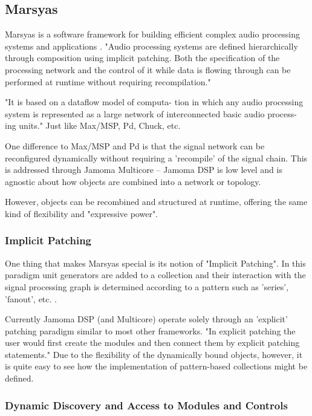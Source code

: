 \documentclass[twoside,10pt]{article}
\begin{document}

\subsection{Marsyas} %

Marsyas is a software framework for building efficient complex audio processing systems and applications \cite{Tzanetakis:2008}. "Audio processing systems are defined hierarchically through composition using implicit patching. Both the specification of the processing network and the control of it while data is flowing through can be performed at runtime without requiring recompilation."

"It is based on a dataflow model of computa- tion in which any audio processing system is represented as a large network of interconnected basic audio process- ing units."  Just like Max/MSP, Pd, Chuck, etc.

One difference to Max/MSP and Pd is that the signal network can be reconfigured dynamically without requiring a 'recompile' of the signal chain.  This is addressed through Jamoma Multicore -- Jamoma DSP is low level and is agnostic about how objects are combined into a network or topology.

However, objects can be recombined and structured at runtime, offering the same kind of flexibility and "expressive power".

\subsubsection{Implicit Patching}

One thing that makes Marsyas special is its notion of "Implicit Patching".  In this paradigm unit generators are added to a collection and their interaction with the signal processing graph is determined according to a pattern such as 'series', 'fanout', etc. \cite{Bray:2005}.

Currently Jamoma DSP (and Multicore) operate solely through an 'explicit' patching paradigm similar to most other frameworks.  "In explicit patching the user would first create the modules and then connect them by explicit patching statements."  Due to the flexibility of the dynamically bound objects, however, it is quite easy to see how the implementation of pattern-based collections might be defined.


\subsubsection{Dynamic Discovery and Access to Modules and Controls}
\end{document}

